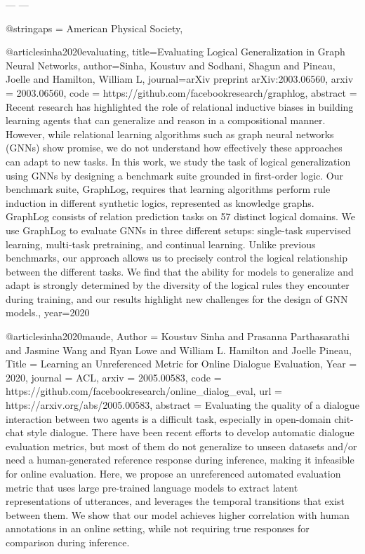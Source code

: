 ---
---

@string{aps = {American Physical Society,}}

@article{sinha2020evaluating,
  title={Evaluating Logical Generalization in Graph Neural Networks},
  author={Sinha, Koustuv and Sodhani, Shagun and Pineau, Joelle and Hamilton, William L},
  journal={arXiv preprint arXiv:2003.06560},
  arxiv = {2003.06560},
  code = {https://github.com/facebookresearch/graphlog},
  abstract = {Recent research has highlighted the role of relational inductive biases in building learning agents that can generalize and reason in a compositional manner. However, while relational learning algorithms such as graph neural networks (GNNs) show promise, we do not understand how effectively these approaches can adapt to new tasks. In this work, we study the task of logical generalization using GNNs by designing a benchmark suite grounded in first-order logic. Our benchmark suite, GraphLog, requires that learning algorithms perform rule induction in different synthetic logics, represented as knowledge graphs. GraphLog consists of relation prediction tasks on 57 distinct logical domains. We use GraphLog to evaluate GNNs in three different setups: single-task supervised learning, multi-task pretraining, and continual learning. Unlike previous benchmarks, our approach allows us to precisely control the logical relationship between the different tasks. We find that the ability for models to generalize and adapt is strongly determined by the diversity of the logical rules they encounter during training, and our results highlight new challenges for the design of GNN models.},
  year={2020}
}

@article{sinha2020maude,
  Author = {Koustuv Sinha and Prasanna Parthasarathi and Jasmine Wang and Ryan Lowe and William L. Hamilton and Joelle Pineau},
  Title = {Learning an Unreferenced Metric for Online Dialogue Evaluation},
  Year = {2020},
  journal = {ACL},
  arxiv = {2005.00583},
  code = {https://github.com/facebookresearch/online_dialog_eval},
  url = {https://arxiv.org/abs/2005.00583},
  abstract = {Evaluating the quality of a dialogue interaction between two agents is a difficult task, especially in open-domain chit-chat style dialogue. There have been recent efforts to develop automatic dialogue evaluation metrics, but most of them do not generalize to unseen datasets and/or need a human-generated reference response during inference, making it infeasible for online evaluation. Here, we propose an unreferenced automated evaluation metric that uses large pre-trained language models to extract latent representations of utterances, and leverages the temporal transitions that exist between them. We show that our model achieves higher correlation with human annotations in an online setting, while not requiring true responses for comparison during inference.}
}

